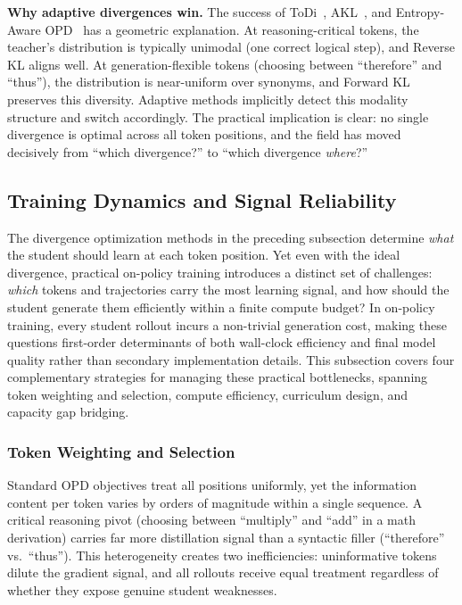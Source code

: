 \documentclass{article} %
\begin{document}
\textbf{Why adaptive divergences win.}
The success of ToDi~\citep{2505.16297}, AKL~\citep{2404.02657}, and Entropy-Aware OPD~\citep{2603.07079} has a geometric explanation. At reasoning-critical tokens, the teacher's distribution is typically unimodal (one correct logical step), and Reverse KL aligns well. At generation-flexible tokens (choosing between ``therefore'' and ``thus''), the distribution is near-uniform over synonyms, and Forward KL preserves this diversity. Adaptive methods implicitly detect this modality structure and switch accordingly. The practical implication is clear: no single divergence is optimal across all token positions, and the field has moved decisively from ``which divergence?'' to ``which divergence \emph{where}?''



\subsection{Training Dynamics and Signal Reliability}
\label{subsec:training_dynamics}

The divergence optimization methods in the preceding subsection determine \emph{what} the student should learn at each token position. Yet even with the ideal divergence, practical on-policy training introduces a distinct set of challenges: \emph{which} tokens and trajectories carry the most learning signal, and how should the student generate them efficiently within a finite compute budget? In on-policy training, every student rollout incurs a non-trivial generation cost, making these questions first-order determinants of both wall-clock efficiency and final model quality rather than secondary implementation details. This subsection covers four complementary strategies for managing these practical bottlenecks, spanning token weighting and selection, compute efficiency, curriculum design, and capacity gap bridging.

\subsubsection{Token Weighting and Selection}

Standard OPD objectives treat all positions uniformly, yet the information content per token varies by orders of magnitude within a single sequence. A critical reasoning pivot (choosing between ``multiply'' and ``add'' in a math derivation) carries far more distillation signal than a syntactic filler (``therefore'' vs.\ ``thus''). This heterogeneity creates two inefficiencies: uninformative tokens dilute the gradient signal, and all rollouts receive equal treatment regardless of whether they expose genuine student weaknesses.
\end{document}
